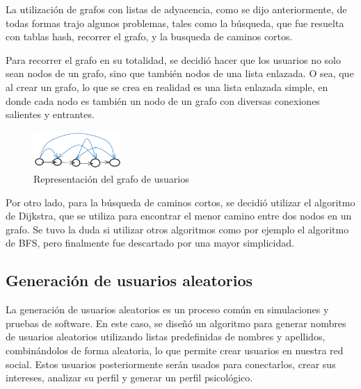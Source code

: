 \documentclass[9pt,letterpaper,onecolumn]{rho-class/rho}
\begin{document}
\vspace{0.5cm}

La utilización de grafos con listas de adyacencia, como se dijo anteriormente, de todas formas trajo algunos problemas, tales como la búsqueda, que fue resuelta con tablas hash, recorrer el grafo, y la busqueda de caminos cortos.

\vspace{0.5cm}

Para recorrer el grafo en su totalidad, se decidió hacer que los usuarios no solo sean nodos de un grafo, sino que también nodos de una lista enlazada. O sea, que al crear un grafo, lo que se crea en realidad es una lista enlazada simple, en donde cada nodo es también un nodo de un grafo con diversas conexiones salientes y entrantes. 

\begin{figure}[H]
    \centering
    \includegraphics[width=0.3\textwidth]{figures/grafo.png}
    \caption{Representación del grafo de usuarios}
\end{figure}

Por otro lado, para la búsqueda de caminos cortos, se decidió utilizar el algoritmo de Dijkstra, que se utiliza para encontrar el menor camino entre dos nodos en un grafo. Se tuvo la duda si utilizar otros algoritmos como por ejemplo el algoritmo de BFS, pero finalmente fue descartado por una mayor simplicidad.

\subsection{Generación de usuarios aleatorios}
La generación de usuarios aleatorios es un proceso común en simulaciones y pruebas de software. 
En este caso, se diseñó un algoritmo para generar nombres de usuarios aleatorios utilizando listas predefinidas de nombres y apellidos, combinándolos de forma aleatoria, lo que permite crear usuarios en nuestra red social.
Estos usuarios posteriormente serán usados para conectarlos, crear sus intereses, analizar su perfil y generar un perfil psicológico.
\end{document}
